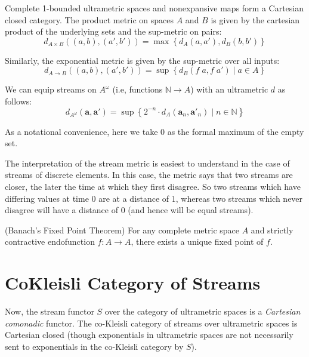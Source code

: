 \documentclass[preprint]{sigplanconf}
\newcommand{\N}{\mathbb{N}}
\newcommand{\setof}[1]{\left\{{#1}\right\}}
\newcommand{\comprehend}[2]{\setof{{#1}\;|\;{#2}}}
\newcommand{\stream}[1]{\mathbf{#1}}
\begin{document}
Complete 1-bounded ultrametric spaces and nonexpansive maps form a 
Cartesian closed category. The product metric on spaces $A$ and $B$
is given by the cartesian product of the underlying sets and the sup-metric
on pairs:
\begin{displaymath}
  d_{A \times B}((a,b), (a',b')) = \max \setof{d_A(a,a'), d_B(b,b')}
\end{displaymath}

Similarly, the exponential metric is given by the sup-metric over all
inputs:
\begin{displaymath}
  d_{A \to B}((a,b), (a',b')) = \sup \comprehend{d_B(f\;a,f\;a')}{a \in A}
\end{displaymath}

We can equip streams on $A^\omega$ (i.e, functions $\N \to A$) with an
ultrametric $d$ as follows: 
\begin{displaymath}
  d_{A^\omega}(\stream{a}, \stream{a}') = \sup \comprehend{2^{-n}\cdot d_A(\stream{a}_n, \stream{a}'_n)}{n \in \N}

\end{displaymath}

As a notational convenience, here we take $0$ as the formal
maximum of the empty set.

The interpretation of the stream metric is easiest to understand in
the case of streams of discrete elements. In this case, the metric
says that two streams are closer, the later the time at which they
first disagree. So two streams which have differing values at time $0$
are at a distance of $1$, whereas two streams which never disagree
will have a distance of $0$ (and hence will be equal streams).

\begin{prop}{(Banach's Fixed Point Theorem)}
For any complete metric space $A$ and strictly contractive endofunction
$f : A \to A$, there exists a unique fixed point of $f$. 
\end{prop}

\section{CoKleisli Category of Streams}

Now, the stream functor $S$ over the category of ultrametric spaces is
a \emph{Cartesian comonadic} functor. The co-Kleisli category of
streams over ultrametric spaces is Cartesian closed (though
exponentials in ultrametric spaces are not necessarily sent to
exponentials in the co-Kleisli category by $S$).
\end{document}

